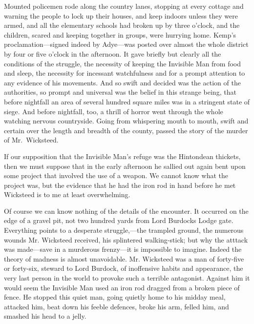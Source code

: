 Mounted policemen rode along the country lanes, stopping at every cottage and warning the people to lock up their houses, and keep indoors unless they were armed, and all the elementary schools had broken up by three o’clock, and the children, scared and keeping together in groups, were hurrying home. Kemp’s proclamation—signed indeed by Adye—was posted over almost the whole district by four or five o’clock in the afternoon. It gave briefly but clearly all the conditions of the struggle, the necessity of keeping the Invisible Man from food and sleep, the necessity for incessant watchfulness and for a prompt attention to any evidence of his movements. And so swift and decided was the action of the authorities, so prompt and universal was the belief in this strange being, that before nightfall an area of several hundred square miles was in a stringent state of siege. And before nightfall, too, a thrill of horror went through the whole watching nervous countryside. Going from whispering mouth to mouth, swift and certain over the length and breadth of the county, passed the story of the murder of Mr.\ Wicksteed.

If our supposition that the Invisible Man’s refuge was the Hintondean thickets, then we must suppose that in the early afternoon he sallied out again bent upon some project that involved the use of a weapon. We cannot know what the project was, but the evidence that he had the iron rod in hand before he met Wicksteed is to me at least overwhelming.

Of course we can know nothing of the details of the encounter. It occurred on the edge of a gravel pit, not two hundred yards from Lord Burdocks Lodge gate. Everything points to a desperate struggle,—the trampled ground, the numerous wounds Mr. Wicksteed received, his splintered walking-stick; but why the atttack was made—save in a murderous frenzy—it is impossible to imagine. Indeed the theory of madness is almost unavoidable. Mr. Wicksteed was a man of forty-five or forty-six, steward to Lord Burdock, of inoffensive habits and appearance, the very last person in the world to provoke such a terrible antagonist. Against him it would seem the Invisible Man used an iron rod dragged from a broken piece of fence. He stopped this quiet man, going quietly home to his midday meal, attacked him, beat down his feeble defences, broke his arm, felled him, and smashed his head to a jelly.

